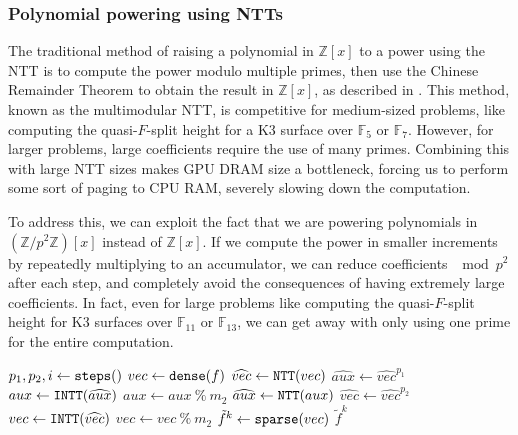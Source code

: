 \subsubsection{Polynomial powering using NTTs}

The traditional method of raising a polynomial in $\mathbb{Z}[x]$ 
to a power using the NTT is to compute the power modulo multiple primes, 
then use the Chinese Remainder Theorem to obtain the result in 
$\mathbb{Z}[x]$, as described in \cite{monagan-2012-sparse-powering}.
This method, known as the multimodular NTT, is competitive 
for medium-sized problems, like 
computing the quasi-$F$-split height for a K3 surface over 
$\mathbb{F}_5$ or $\mathbb{F}_7$. However, for larger problems, 
large coefficients require the use of many primes. Combining this 
with large NTT sizes makes GPU DRAM size a bottleneck, 
forcing us to perform some sort of paging to CPU RAM, severely 
slowing down the computation.

To address this, we can exploit the fact that we are powering 
polynomials in $(\mathbb{Z}/p^2\mathbb{Z})[x]$ instead of $\mathbb{Z}[x]$. 
If we compute the power in smaller increments by repeatedly 
multiplying to an accumulator, we can reduce coefficients $\mod p^2$ 
after each step, and completely avoid the consequences of having 
extremely large coefficients. In fact, even for large problems like 
computing the quasi-$F$-split height for K3 surfaces over 
$\mathbb{F}_{11}$ or $\mathbb{F}_{13}$, we can get away with only using 
one prime for the entire computation.

\begin{algorithm}[H]
    \caption{Incremental polynomial powering}
    \label{alg:poly:incr}
    $p_1, p_2, i \gets \textnormal{\texttt{steps}}()$\;
    $vec \gets \textnormal{\texttt{dense}}(f)$\;
    $\widehat{vec} \gets \textnormal{\texttt{NTT}}(vec)$\;
    $\widehat{aux} \gets \widehat{vec}^{p_1}$\;
    $aux \gets \textnormal{\texttt{INTT}}(\widehat{aux})$\;
    $aux \gets aux ~\%~ m_2$\;
    $\widehat{aux} \gets \textnormal{\texttt{NTT}}(aux)$\;
    $\widehat{vec} \gets \widehat{vec}^{p_2}$\;
    $vec \gets \textnormal{\texttt{INTT}}(\widehat{vec})$\;
    $vec \gets vec ~\%~ m_2$\;
    $\tilde{f}^k \gets \textnormal{\texttt{sparse}}(vec)$\;
    \Return $\tilde{f}^k$
\end{algorithm}

